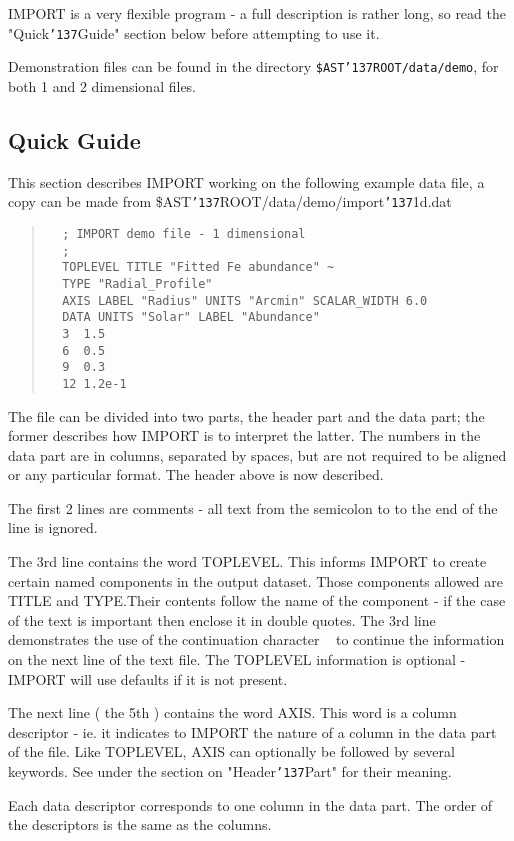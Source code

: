 \documentclass{book}
\renewcommand{\_}{{\tt\char'137}}     %
\begin{document}
IMPORT is a very flexible program - a full description is rather
long, so read the "Quick\_Guide" section below before attempting
to use it.
 
Demonstration files can be found in the directory {\tt \$AST\_ROOT/data/demo}, for
both 1 and 2 dimensional files.
 
\subsection{Quick Guide}
This section describes IMPORT working on the following example data file, a
copy can be made from \$AST\_ROOT/data/demo/import\_1d.dat
 
\begin{quote}\begin{verbatim}
  ; IMPORT demo file - 1 dimensional
  ;
  TOPLEVEL TITLE "Fitted Fe abundance" ~
  TYPE "Radial_Profile"
  AXIS LABEL "Radius" UNITS "Arcmin" SCALAR_WIDTH 6.0
  DATA UNITS "Solar" LABEL "Abundance"
  3  1.5
  6  0.5
  9  0.3
  12 1.2e-1
\end{verbatim}\end{quote}
The file can be divided into two parts, the header part and the
data part; the former describes how IMPORT is to interpret the
latter. The numbers in the data part are in columns, separated
by spaces, but are not required to be aligned or any particular
format. The header above is now described.
 
The first 2 lines are comments - all text from the semicolon to
to the end of the line is ignored.
 
The 3rd line contains the word TOPLEVEL. This informs IMPORT to
create certain named components in the output dataset. Those
components allowed are TITLE and TYPE.Their contents follow the
name of the component - if the case of the text is important
then enclose it in double quotes. The 3rd line demonstrates the
use of the continuation character {\tt ~} to continue the information
on the next line of the text file. The TOPLEVEL information is
optional - IMPORT will use defaults if it is not present.
 
The next line ( the 5th ) contains the word AXIS. This word is
a column descriptor - ie. it indicates to IMPORT the nature of
a column in the data part of the file. Like TOPLEVEL, AXIS can
optionally be followed by several keywords. See under the
section on "Header\_Part" for their meaning.
 
Each data descriptor corresponds to one column in the data part.
The order of the descriptors is the same as the columns.
 
\end{document}
